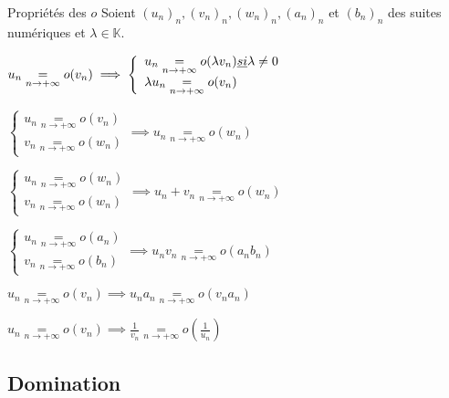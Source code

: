     \begin{theo}{Propriétés des $o$}{}
        Soient $(u_n)_n, (v_n)_n, (w_n)_n, (a_n)_n$ et $(b_n)_n$ des suites numériques et $\lambda \in \mathbb{K}$.
    
        \begin{alors}
            \item $u_n \underset{n \rightarrow +\infty}{=} o(v_n) \implies \left\{ \begin{array}{l}
                u_n \underset{n \rightarrow +\infty}{=} o(\lambda v_n) \emph{ si } \lambda \neq 0 \\
                \lambda u_n \underset{n \rightarrow +\infty}{=} o(v_n)
            \end{array}\right.$
            \item $\left\{ \begin{array}{l}
                u_n \underset{n \rightarrow +\infty}{=} o(v_n) \\
                v_n \underset{n \rightarrow +\infty}{=} o(w_n)
            \end{array} \right. \implies u_n \underset{n \rightarrow +\infty}{=} o(w_n)$
            \item $\left\{ \begin{array}{l}
                u_n \underset{n \rightarrow +\infty}{=} o(w_n) \\
                v_n \underset{n \rightarrow +\infty}{=} o(w_n)
            \end{array} \right. \implies u_n + v_n \underset{n \rightarrow +\infty}{=} o(w_n)$
            \item $\left\{ \begin{array}{l}
                u_n \underset{n \rightarrow +\infty}{=} o(a_n) \\
                v_n \underset{n \rightarrow +\infty}{=} o(b_n)
            \end{array} \right. \implies u_n v_n \underset{n \rightarrow +\infty}{=} o(a_n b_n)$
            \item $ u_n \underset{n \rightarrow +\infty}{=} o(v_n) \implies u_n a_n \underset{n \rightarrow +\infty}{=} o(v_n a_n)$
            \item $ u_n \underset{n \rightarrow +\infty}{=} o(v_n) \implies \frac{1}{v_n} \underset{n \rightarrow +\infty}{=} o\left(\frac{1}{u_n}\right)$
        \end{alors}
    \end{theo}

\subsection{Domination}


